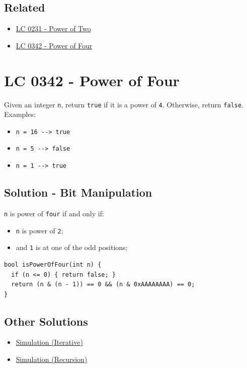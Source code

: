 \subsection*{Related}
\begin{itemize}
\item \hyperref[lc0231]{LC 0231 - Power of Two}
\item \hyperref[lc0342]{LC 0342 - Power of Four}
\end{itemize}

\section{LC 0342 - Power of Four}\label{lc0342}
Given an integer {\colorbox{CodeBackground}{\lstinline|n|}}, return {\colorbox{CodeBackground}{\lstinline|true|}} if it is a power of {\colorbox{CodeBackground}{\lstinline|4|}}. Otherwise, return {\colorbox{CodeBackground}{\lstinline|false|}}.\\

Examples:
\begin{itemize}
\item {\colorbox{CodeBackground}{\lstinline|n = 16 --> true|}}
\item {\colorbox{CodeBackground}{\lstinline|n = 5 --> false|}}
\item {\colorbox{CodeBackground}{\lstinline|n = 1 --> true|}}
\end{itemize}

\subsection*{Solution - Bit Manipulation}\label{solution:lc0342_bit_manipulation}
{\colorbox{CodeBackground}{\lstinline|n|}} is power of {\colorbox{CodeBackground}{\lstinline|four|}} if and only if:
\begin{itemize}
\item {\colorbox{CodeBackground}{\lstinline|n|}} is power of {\colorbox{CodeBackground}{\lstinline|2|}};
\item and {\colorbox{CodeBackground}{\lstinline|1|}} is at one of the odd positions;
\end{itemize}
\begin{lstlisting}
bool isPowerOfFour(int n) {
  if (n <= 0) { return false; }
  return (n & (n - 1)) == 0 && (n & 0xAAAAAAAA) == 0;
}
\end{lstlisting}

\subsection*{Other Solutions}
\begin{itemize}
\item \hyperref[solution:lc0342_simulation_iterative]{Simulation (Iterative)}
\item \hyperref[solution:lc0342_simulation_recursion]{Simulation (Recursion)}
\end{itemize}

